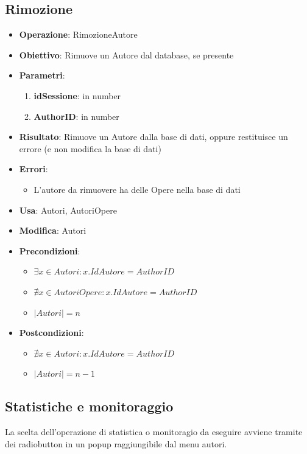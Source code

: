 \documentclass[a4paper,11pt]{article}
\begin{document}
\subsection{Rimozione}
\begin{itemize}
	\item \textbf{Operazione}: RimozioneAutore
	\item \textbf{Obiettivo}: Rimuove un Autore dal database, se presente
	\item \textbf{Parametri}:
	\begin{enumerate}
		\item \textbf{idSessione}: in number
		\item \textbf{AuthorID}: in number
	\end{enumerate}
	\item \textbf{Risultato}: Rimuove un Autore dalla base di dati, oppure restituisce un errore (e non modifica la base di dati)
	\item \textbf{Errori}: 
	\begin{itemize}
		\item L'autore da rimuovere ha delle Opere nella base di dati
	\end{itemize}
	\item \textbf{Usa}: Autori, AutoriOpere
	\item \textbf{Modifica}: Autori
	\item \textbf{Precondizioni}:
	\begin{itemize}
		\item $\exists x \in Autori : x.IdAutore = AuthorID$
		\item $\nexists x \in AutoriOpere : x.IdAutore = AuthorID$
		\item $|Autori| = n$
	\end{itemize}
	\item \textbf{Postcondizioni}:
	\begin{itemize}
		\item $\nexists x \in Autori : x.IdAutore = AuthorID$
		\item $|Autori| = n - 1$
	\end{itemize}
\end{itemize}

\subsection{Statistiche e monitoraggio}
La scelta dell'operazione di statistica o monitoragio da eseguire avviene tramite dei radiobutton in un popup raggiungibile dal menu autori.
\end{document}
